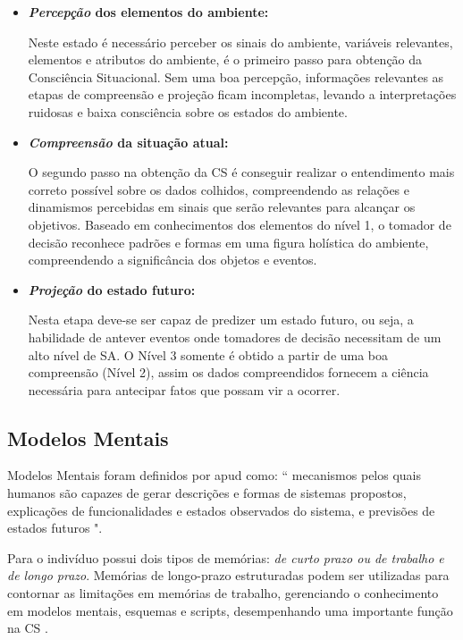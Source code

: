 \documentclass[12pt]{article}
\begin{document}
\begin{itemize}
		
	\item \textbf{\textit{Percepção} dos elementos do ambiente:}
	
	Neste estado é necessário perceber os sinais do ambiente, variáveis relevantes, elementos e atributos do ambiente, é o primeiro passo para obtenção da Consciência Situacional. Sem uma boa percepção, informações relevantes as etapas de compreensão e projeção ficam incompletas, levando a interpretações ruidosas e baixa consciência sobre os estados do ambiente.
	
	\item  \textbf{\textit{Compreensão} da situação atual:}
	
	O segundo passo na obtenção da CS é conseguir realizar o entendimento mais correto possível sobre os dados colhidos, compreendendo as relações e dinamismos percebidas em sinais que serão relevantes para alcançar os objetivos. Baseado em conhecimentos dos elementos do nível 1, o tomador de decisão reconhece padrões e formas em uma figura holística do ambiente, compreendendo a significância dos objetos e eventos.	
	
	\item \textbf{\textit{Projeção} do estado futuro:}
	
	Nesta etapa deve-se ser capaz de predizer um estado futuro, ou seja, a habilidade de antever eventos onde tomadores de decisão necessitam de um alto nível de SA. O Nível 3 somente é obtido a partir de uma boa compreensão (Nível 2), assim os dados compreendidos fornecem a ciência necessária para antecipar fatos que possam vir a ocorrer.
	
\end{itemize}

\subsection{Modelos Mentais}

Modelos Mentais foram definidos por \cite[p.60]{Rouse1985} apud \cite{Endsley1995} como: `` mecanismos pelos quais humanos são capazes de gerar descrições e formas de sistemas propostos, explicações de funcionalidades e estados observados do sistema, e previsões de estados futuros ".

Para \cite{Endsley2012} o indivíduo  possui dois tipos de memórias: \textit{de curto prazo ou de trabalho e de longo prazo}. Memórias de longo-prazo estruturadas podem ser utilizadas para contornar as limitações em memórias de trabalho, gerenciando o conhecimento em modelos mentais, esquemas e scripts, desempenhando uma importante função na CS \cite{Endsley1995}.
\end{document}
